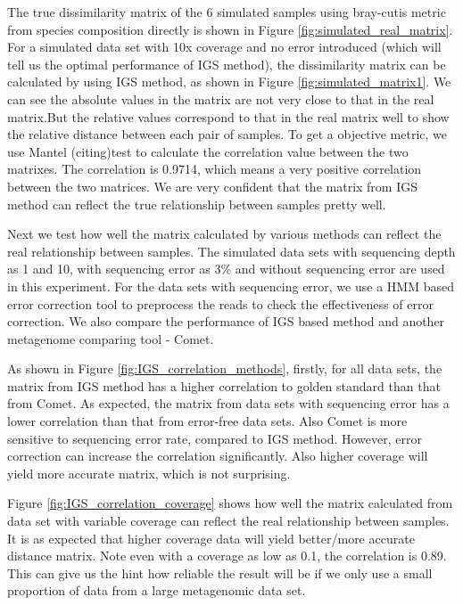 \documentclass[12pt]{report}
\begin{document}
The true dissimilarity matrix of the 6 simulated samples using bray-cutis metric from species composition directly is shown in Figure \ref{fig:simulated_real_matrix}.
For a simulated data set with 10x coverage and no error introduced (which will tell us the optimal performance of IGS method), the dissimilarity matrix can be calculated by using IGS method, as shown in Figure \ref{fig:simulated_matrix1}. We can see the absolute values in the matrix are not very close to that in the real matrix.But the relative values correspond to that in the real matrix well to show the relative distance between each pair of samples. To get a objective metric, we use 
Mantel (citing)test to calculate the correlation value between the two matrixes. The correlation is 0.9714, which means a very positive correlation between the two matrices. We are very confident that the matrix from IGS method can reflect the true relationship between samples pretty well.

Next we test how well the matrix calculated by various methods can reflect the real relationship between samples. 
The simulated data sets with sequencing depth as 1 and 10, with sequencing error as 3\% and without sequencing error are used in this experiment.
For the data sets with sequencing error, we use a HMM based error correction tool to preprocess the reads to check the effectiveness 
of error correction. We also  compare the performance of IGS based method and another metagenome comparing tool - Comet. 

As shown in Figure \ref{fig:IGS_correlation_methods}, firstly, for all data sets, the matrix from IGS method has a higher 
correlation to golden standard than that from Comet.  As expected, the matrix from data sets with sequencing error has a lower correlation than that from error-free
data sets. Also Comet is more sensitive to sequencing error rate, compared to IGS method.
However, error correction can increase the correlation significantly. Also higher coverage will yield more accurate matrix, which is not surprising.

Figure \ref{fig:IGS_correlation_coverage} shows how well the matrix calculated from data set with variable coverage can 
reflect the real relationship between samples. It is as expected that higher coverage data will yield better/more accurate distance matrix.
Note even with a coverage as low as 0.1, the correlation is 0.89. This can  give us the hint how reliable the result will be if 
we only use a small proportion of data from a large metagenomic data set.
\end{document}
